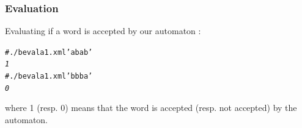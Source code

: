 \begin{center}
\end{center}

\subsubsection{Evaluation}

Evaluating if a word is accepted by our automaton :
\begin{alltt}
# ./b eval a1.xml 'abab'
\textit{1}
# ./b eval a1.xml 'bbba'
\textit{0}
\end{alltt}
where 1 (resp. 0) means that the word is accepted (resp. not accepted)
by the automaton.

